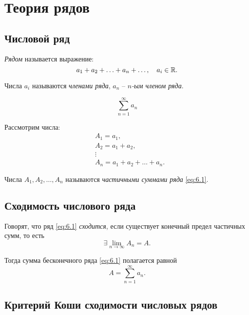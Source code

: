 \section{Теория рядов}

\setcounter{subsection}{28}

\subsection{Числовой ряд}

\begin{definition}[Ряд]
    \emph{Рядом} называется выражение:
    \[
        a_1 + a_2 + \ldots + a_n + \ldots, \quad a_i \in \mathbb{R}.
    \]

    Числа $ a_i $ называются \emph{членами ряда}, $ a_n $ -- \emph{$ n $-ым членом ряда}.

    \begin{equation}\label{eq:6.1}
        \sum_{n=1}^{\infty}a_n
    \end{equation}

    Рассмотрим числа:
    \begin{align*}
         & A_1 = a_1,                      \\
         & A_2 = a_1 + a_2,                \\
         & \vdots                          \\
         & A_n = a_1 + a_2 + \ldots + a_n.
    \end{align*}

    Числа $ A_1,A_2,\ldots,A_n $ называются \emph{частичными суммами ряда} \ref{eq:6.1}.
\end{definition}

\subsection{Сходимость числового ряда}

\begin{definition}
    Говорят, что ряд \ref{eq:6.1} \emph{сходится}, если существует конечный предел частичных сумм, то есть
    \[
        \exists \underset{n\rightarrow\infty}{\lim}A_n = A.
    \]

    Тогда сумма бесконечного ряда \ref{eq:6.1} полагается равной
    \[
        A = \sum_{n=1}^{\infty}a_n.
    \]
\end{definition}

\subsection{Критерий Коши сходимости числовых рядов}

